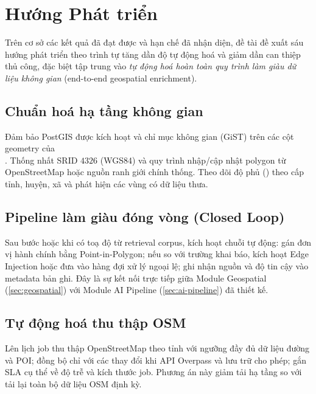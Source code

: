 \section{Hướng Phát triển}
\label{sec:concl-future}

Trên cơ sở các kết quả đã đạt được và hạn chế đã nhận diện, đề tài đề xuất sáu hướng phát triển theo trình tự tăng dần độ tự động hoá và giảm dần can thiệp thủ công, đặc biệt tập trung vào \emph{tự động hoá hoàn toàn quy trình làm giàu dữ liệu không gian} (end-to-end geospatial enrichment).

\subsection{Chuẩn hoá hạ tầng không gian}
\label{sec:concl-h1}

Đảm bảo PostGIS được kích hoạt và chỉ mục không gian (GiST) trên các cột geometry của \\ . Thống nhất SRID \(4326\) (WGS84) và quy trình nhập/cập nhật polygon từ OpenStreetMap hoặc nguồn ranh giới chính thống. Theo dõi độ phủ () theo cấp tỉnh, huyện, xã và phát hiện các vùng có dữ liệu thưa.

\subsection{Pipeline làm giàu đóng vòng (Closed Loop)}
\label{sec:concl-h2}

Sau bước  hoặc khi có toạ độ từ retrieval corpus, kích hoạt chuỗi tự động: gán đơn vị hành chính bằng Point-in-Polygon; nếu  so với trường khai báo, kích hoạt Edge Injection hoặc đưa vào hàng đợi xử lý ngoại lệ; ghi nhận nguồn và độ tin cậy vào metadata bản ghi. Đây là sự kết nối trực tiếp giữa Module Geospatial (\ref{sec:geospatial}) với Module AI Pipeline (\ref{sec:ai-pipeline}) đã thiết kế.

\subsection{Tự động hoá thu thập OSM}
\label{sec:concl-h3}

Lên lịch job thu thập OpenStreetMap theo tỉnh với ngưỡng đầy đủ dữ liệu đường và POI; đồng bộ  chỉ với các thay đổi khi API Overpass và lưu trữ cho phép; gắn SLA cụ thể về độ trễ và kích thước job. Phương án này giảm tải hạ tầng so với tải lại toàn bộ dữ liệu OSM định kỳ.

